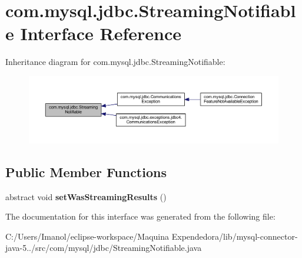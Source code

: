 \hypertarget{interfacecom_1_1mysql_1_1jdbc_1_1_streaming_notifiable}{}\section{com.\+mysql.\+jdbc.\+Streaming\+Notifiable Interface Reference}
\label{interfacecom_1_1mysql_1_1jdbc_1_1_streaming_notifiable}


Inheritance diagram for com.\+mysql.\+jdbc.\+Streaming\+Notifiable\+:
\nopagebreak
\begin{figure}[H]
\begin{center}
\leavevmode
\includegraphics[width=350pt]{interfacecom_1_1mysql_1_1jdbc_1_1_streaming_notifiable__inherit__graph}
\end{center}
\end{figure}
\subsection*{Public Member Functions}
\begin{DoxyCompactItemize}
\item 
\mbox{\label{interfacecom_1_1mysql_1_1jdbc_1_1_streaming_notifiable_aef8def04dd6ed3b13240338091093c84}} 
abstract void {\bfseries set\+Was\+Streaming\+Results} ()
\end{DoxyCompactItemize}


The documentation for this interface was generated from the following file\+:\begin{DoxyCompactItemize}
\item 
C\+:/\+Users/\+Imanol/eclipse-\/workspace/\+Maquina Expendedora/lib/mysql-\/connector-\/java-\/5../src/com/mysql/jdbc/Streaming\+Notifiable.\+java\end{DoxyCompactItemize}
